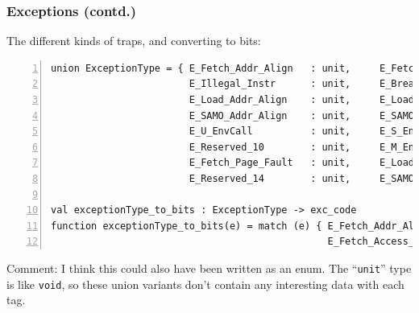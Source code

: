 \documentclass[aspectratio=169]{beamer}
\newcommand{\slidefont}{\scriptsize}
\newcommand{\cf}{\scriptsize\tt}
\begin{document}
\begin{frame}[fragile]
  \frametitle{Exceptions (contd.)}

  \slidefont

  The different kinds of traps, and converting to bits:

  \begin{Verbatim}[frame=single, numbers=left, label = File riscv\_types.sail]
union ExceptionType = { E_Fetch_Addr_Align   : unit,     E_Fetch_Access_Fault : unit,
                        E_Illegal_Instr      : unit,     E_Breakpoint         : unit,
                        E_Load_Addr_Align    : unit,     E_Load_Access_Fault  : unit,
                        E_SAMO_Addr_Align    : unit,     E_SAMO_Access_Fault  : unit,
                        E_U_EnvCall          : unit,     E_S_EnvCall          : unit,
                        E_Reserved_10        : unit,     E_M_EnvCall          : unit,
                        E_Fetch_Page_Fault   : unit,     E_Load_Page_Fault    : unit,
                        E_Reserved_14        : unit,     E_SAMO_Page_Fault    : unit }

val exceptionType_to_bits : ExceptionType -> exc_code
function exceptionType_to_bits(e) = match (e) { E_Fetch_Addr_Align()   => 0x00,
                                                E_Fetch_Access_Fault() => 0x01, ...}
  \end{Verbatim}

  \begin{minipage}{\textwidth}
    Comment: I think this could also have been written as an
    enum.  The ``{\cf unit}'' type is like {\cf void}, so these union
    variants don't contain any interesting data with each tag.
  \end{minipage}

\end{frame}

\end{document}
